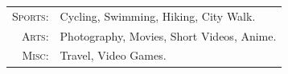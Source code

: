 

\begin{tabular}{rl}
    \textsc{Sports:} &Cycling, Swimming, Hiking, City Walk.\\
    \textsc{Arts:} & Photography, Movies, Short Videos, Anime.\\ 
    \textsc{Misc:} & Travel, Video Games.\\
\end{tabular}